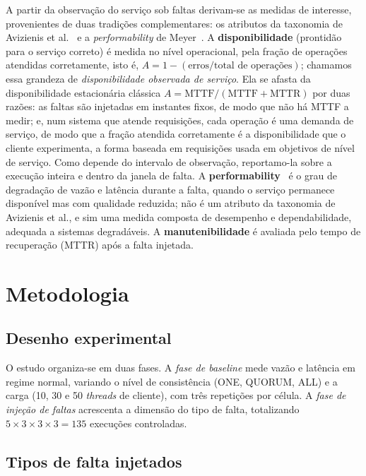\documentclass[runningheads]{llncs}
\begin{document}
A partir da observação do serviço sob faltas derivam-se as medidas de interesse,
provenientes de duas tradições complementares: os atributos da taxonomia de
Avizienis et al.~\cite{avizienis2004basic} e a \emph{performability} de
Meyer~\cite{meyer1980}. A \textbf{disponibilidade} (prontidão para o serviço
correto) é medida no nível operacional, pela fração de operações atendidas
corretamente, isto é, $A = 1 - (\text{erros}/\text{total de operações})$;
chamamos essa grandeza de \emph{disponibilidade observada de serviço}. Ela se
afasta da disponibilidade estacionária clássica
$A = \text{MTTF}/(\text{MTTF}+\text{MTTR})$ por duas razões: as faltas são
injetadas em instantes fixos, de modo que não há MTTF a medir; e, num sistema que
atende requisições, cada operação é uma demanda de serviço, de modo que a fração
atendida corretamente é a disponibilidade que o cliente experimenta, a forma
baseada em requisições usada em objetivos de nível de serviço. Como depende do
intervalo de observação, reportamo-la sobre a execução inteira e dentro da
janela de falta. A
\textbf{performability}~\cite{meyer1980} é o grau de degradação de vazão e
latência durante a falta, quando o serviço permanece disponível mas com qualidade
reduzida; não é um atributo da taxonomia de Avizienis et al., e sim uma medida
composta de desempenho e dependabilidade, adequada a sistemas degradáveis. A
\textbf{manutenibilidade} é avaliada pelo tempo de recuperação (MTTR) após a
falta injetada.

\section{Metodologia}
\label{sec:methodology}

\subsection{Desenho experimental}

O estudo organiza-se em duas fases. A \emph{fase de baseline} mede vazão e
latência em regime normal, variando o nível de consistência (ONE, QUORUM, ALL) e
a carga (10, 30 e 50 \emph{threads} de cliente), com três repetições por célula.
A \emph{fase de injeção de faltas} acrescenta a dimensão do tipo de falta,
totalizando $5 \times 3 \times 3 \times 3 = 135$ execuções controladas.

\subsection{Tipos de falta injetados}
\end{document}
